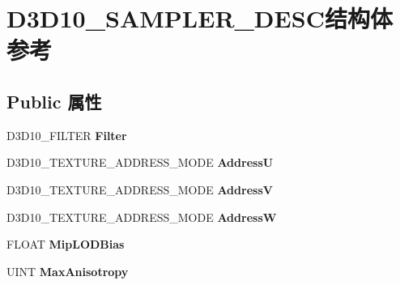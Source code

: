 \hypertarget{struct_d3_d10___s_a_m_p_l_e_r___d_e_s_c}{}\section{D3\+D10\+\_\+\+S\+A\+M\+P\+L\+E\+R\+\_\+\+D\+E\+S\+C结构体 参考}
\label{struct_d3_d10___s_a_m_p_l_e_r___d_e_s_c}
\subsection*{Public 属性}
\begin{DoxyCompactItemize}
\item 
\mbox{\label{struct_d3_d10___s_a_m_p_l_e_r___d_e_s_c_a88938dbe687f3088c7a1e2e2df810b0b}} 
D3\+D10\+\_\+\+F\+I\+L\+T\+ER {\bfseries Filter}
\item 
\mbox{\label{struct_d3_d10___s_a_m_p_l_e_r___d_e_s_c_a6dd98a0b0dc6416afce905e5ec297787}} 
D3\+D10\+\_\+\+T\+E\+X\+T\+U\+R\+E\+\_\+\+A\+D\+D\+R\+E\+S\+S\+\_\+\+M\+O\+DE {\bfseries AddressU}
\item 
\mbox{\label{struct_d3_d10___s_a_m_p_l_e_r___d_e_s_c_a8f97ede6880b62bf37bedd9decdb3776}} 
D3\+D10\+\_\+\+T\+E\+X\+T\+U\+R\+E\+\_\+\+A\+D\+D\+R\+E\+S\+S\+\_\+\+M\+O\+DE {\bfseries AddressV}
\item 
\mbox{\label{struct_d3_d10___s_a_m_p_l_e_r___d_e_s_c_ad10081ba047457d04e25ea8e91ffff51}} 
D3\+D10\+\_\+\+T\+E\+X\+T\+U\+R\+E\+\_\+\+A\+D\+D\+R\+E\+S\+S\+\_\+\+M\+O\+DE {\bfseries AddressW}
\item 
\mbox{\label{struct_d3_d10___s_a_m_p_l_e_r___d_e_s_c_ae9d3eafa55eebd9b740702c36669b2d3}} 
F\+L\+O\+AT {\bfseries Mip\+L\+O\+D\+Bias}
\item 
\mbox{\label{struct_d3_d10___s_a_m_p_l_e_r___d_e_s_c_ade3e4adbf9e4e0caf922157abac41d91}} 
U\+I\+NT {\bfseries Max\+Anisotropy}
\item 
\mbox{\label{struct_d3_d10___s_a_m_p_l_e_r___d_e_s_c_a4ee7d7d3f3c30b65a29c963b1ccc71b0}} 

\end{DoxyCompactItemize}
